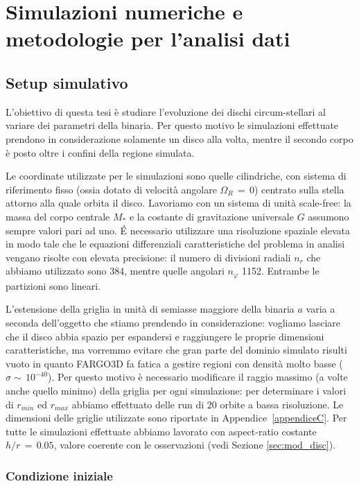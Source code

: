 \chapter{Simulazioni numeriche e metodologie per l'analisi dati}

\section{Setup simulativo} \label{sec:Setup_sim}
L'obiettivo di questa tesi è studiare l'evoluzione dei dischi circum-stellari al variare dei parametri della binaria. Per questo motivo le simulazioni effettuate prendono in considerazione solamente un disco alla volta, mentre il secondo corpo è posto oltre i confini della regione simulata.

Le coordinate utilizzate per le simulazioni sono quelle cilindriche, con sistema di riferimento fisso (ossia dotato di velocità angolare $\Omega_R\,=\,0$) centrato sulla stella attorno alla quale orbita il disco. Lavoriamo con un sistema di unità scale-free: la massa del corpo centrale $M_\ast$ e la costante di gravitazione universale $G$ assumono sempre valori pari ad uno.
\'E necessario utilizzare una risoluzione spaziale elevata in modo tale che le equazioni differenziali caratteristiche del problema in analisi vengano risolte con elevata precisione: il numero di divisioni radiali $n_r$ che abbiamo utilizzato sono 384, mentre quelle angolari $n_\varphi$ 1152. Entrambe le partizioni sono lineari.

L'estensione della griglia in unità di semiasse maggiore della binaria $a$ varia a seconda dell'oggetto che stiamo prendendo in considerazione: vogliamo lasciare che il disco abbia spazio per espandersi e raggiungere le proprie dimensioni caratteristiche, ma vorremmo evitare che gran parte del dominio simulato risulti vuoto in quanto FARGO3D fa fatica a gestire regioni con densità molto basse ($\sigma\sim\,10^{-40}$).
Per questo motivo è necessario modificare il raggio massimo (a volte anche quello minimo) della griglia per ogni simulazione: per determinare i valori di $r_{min}$ ed $r_{max}$ abbiamo effettuato delle run di 20 orbite a bassa risoluzione. Le dimensioni delle griglie utilizzate sono riportate in Appendice~\ref{appendiceC}. 
Per tutte le simulazioni effettuate abbiamo lavorato con aspect-ratio costante $h/r\,=\,0.05$, valore coerente con le osservazioni (vedi Sezione \ref{sec:mod_disc}).

\subsection{Condizione iniziale}

